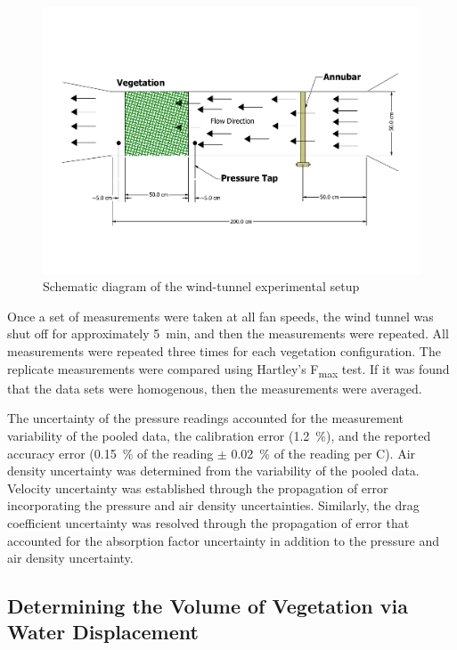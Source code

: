\documentclass[12pt]{article}
\begin{document}
\begin{figure} [!]
	\centering 	
    \includegraphics[width=\textwidth,keepaspectratio]{Drawing1.pdf}
	\caption{Schematic diagram of the wind-tunnel experimental setup}
	\label{fig:WindtunnelSch}
\end{figure}

Once a set of measurements were taken at all fan speeds, the wind tunnel was shut off for approximately 5~\si{min}, and then the measurements were repeated. All measurements were repeated three times for each vegetation configuration. The replicate measurements were compared using Hartley's F\textsubscript{max} test. If it was found that the data sets were homogenous, then the measurements were averaged.

The uncertainty of the pressure readings accounted for the measurement variability of the pooled data, the calibration error (1.2~\%), and the reported accuracy error (0.15~\% of the reading $\pm$ 0.02~\% of the reading per \textdegree C). Air density uncertainty was determined from the variability of the pooled data. Velocity uncertainty was established through the propagation of error incorporating the pressure and air density uncertainties. Similarly, the drag coefficient uncertainty was resolved through the propagation of error that accounted for the absorption factor uncertainty in addition to the pressure and air density uncertainty.


\subsection{Determining the Volume of Vegetation via Water Displacement}
\label{ssec:headingscap}
\end{document}
